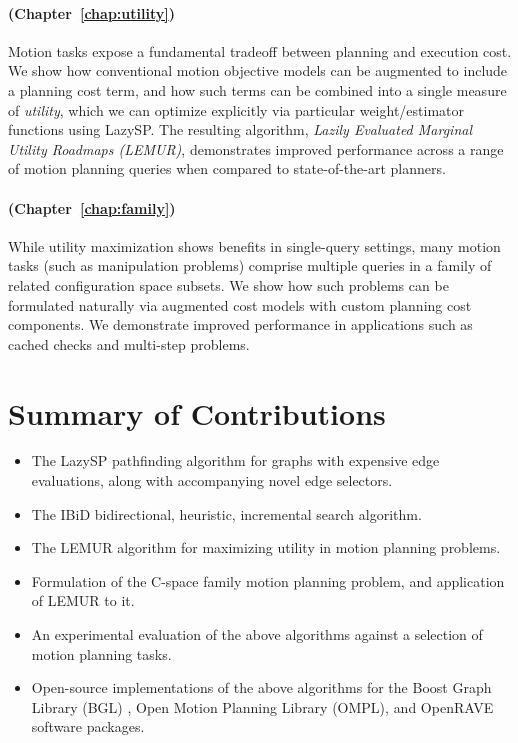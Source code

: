 \paragraph{ (Chapter~\ref{chap:utility})}
Motion tasks expose a fundamental tradeoff between planning and
execution cost.
We show how conventional motion objective models
can be augmented to include a planning cost term,
and how such terms can be combined into a single measure of
\emph{utility},
which we can optimize explicitly
via particular weight/estimator functions using LazySP.
The resulting algorithm,
\emph{Lazily Evaluated Marginal Utility Roadmaps (LEMUR)},
demonstrates improved performance across a range of motion planning
queries
when compared to state-of-the-art planners.

\paragraph{ (Chapter~\ref{chap:family})}
While utility maximization shows benefits in single-query settings,
many motion tasks (such as manipulation problems)
comprise multiple queries in a family of related configuration space
subsets.
We show how such problems can be formulated naturally via
augmented cost models with custom planning cost components.
We demonstrate improved performance in applications such as
cached checks and multi-step problems.


\section{Summary of Contributions}


\begin{itemize}
\item The LazySP pathfinding algorithm for graphs with expensive
   edge evaluations,
   along with accompanying novel edge selectors.
\item The IBiD bidirectional, heuristic, incremental search algorithm.
\item The LEMUR algorithm for maximizing utility
   in motion planning problems.
\item Formulation of the C-space family motion planning problem,
   and application of LEMUR to it.
\item An experimental evaluation of the above algorithms against a
   selection of motion planning tasks.
\item Open-source implementations of the above algorithms for the
   Boost Graph Library (BGL) \citep{siek2001boostgraph},
   Open Motion Planning Library (OMPL), \citep{sucan2012ompl}
   and OpenRAVE \citep{diankov2010openrave} software packages.
\end{itemize}

